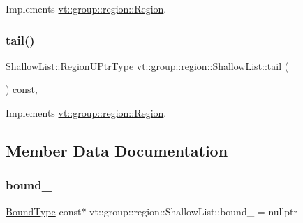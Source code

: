 Implements \hyperlink{structvt_1_1group_1_1region_1_1_region_ae8660d4218b57e91664dedfa807cd936}{vt\+::group\+::region\+::\+Region}.

\mbox{\label{structvt_1_1group_1_1region_1_1_shallow_list_a358a60631cc0d1dd55d72af82e287014}} 
\subsubsection{\texorpdfstring{tail()}{tail()}}
{\footnotesize\ttfamily \hyperlink{structvt_1_1group_1_1region_1_1_region_ae5f42cf159116a3cf8bd65423eb01037}{Shallow\+List\+::\+Region\+U\+Ptr\+Type} vt\+::group\+::region\+::\+Shallow\+List\+::tail (\begin{DoxyParamCaption}{ }\end{DoxyParamCaption}) const\hspace{0.3cm}{\ttfamily [override]}, {\ttfamily [virtual]}}



Implements \hyperlink{structvt_1_1group_1_1region_1_1_region_a7d5bc5711c1b7954e27defa4dc94af40}{vt\+::group\+::region\+::\+Region}.



\subsection{Member Data Documentation}
\mbox{\label{structvt_1_1group_1_1region_1_1_shallow_list_ad1567c77ff9e5cbf61264910072b087f}} 
\subsubsection{\texorpdfstring{bound\+\_\+}{bound\_}}
{\footnotesize\ttfamily \hyperlink{structvt_1_1group_1_1region_1_1_region_abf426ff85bed72c1c6524fad6a9f1751}{Bound\+Type} const$\ast$ vt\+::group\+::region\+::\+Shallow\+List\+::bound\+\_\+ = nullptr\hspace{0.3cm}{\ttfamily [private]}}

